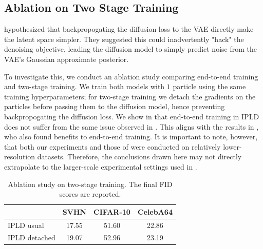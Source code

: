 \subsection{Ablation on Two Stage Training}
\label{app:2stage_ablate}
\citet{leng2025repaeunlockingvaeendtoend} hypothesized that backpropogating the diffusion loss to the \gls*{VAE} directly make the latent space simpler. They suggested this could inadvertently "hack" the denoising objective, leading the diffusion model to simply predict noise from the \gls*{VAE}'s Gaussian approximate posterior.

To investigate this, we conduct an ablation study comparing end-to-end training and two-stage training. We train both models with $1$ particle using the same training hyperparameters; for two-stage training we detach the gradients on the particles before passing them to the diffusion model, hence preventing backpropogating the diffusion loss. We show in  that end-to-end training in \gls*{IPLD} does not suffer from the same issue observed in \citet{leng2025repaeunlockingvaeendtoend}. This aligns with the results in \citet{vahdatscorebasedgenerativemodeling2021}, who also found benefits to end-to-end training. It is important to note, however, that both our experiments and those of \citet{vahdatscorebasedgenerativemodeling2021} were conducted on relatively lower-resolution datasets. Therefore, the conclusions drawn here may not directly extrapolate to the larger-scale experimental settings used in \citet{leng2025repaeunlockingvaeendtoend}.
\begin{table}[htp]
    \centering
    \begin{tabular}{lccc}
\hline
& SVHN           & CIFAR-10      & CelebA64    \\ \hline
\gls*{IPLD} usual & 17.55     &  51.60    & 22.86   \\
\gls*{IPLD} detached & 19.07 & 52.96 &  23.19 \\
\hline
\end{tabular}
    \vspace{0.2cm}
    \caption{Ablation study on two-stage training.  The final \gls*{FID} scores are reported.}
    \label{tab:app_ablate_2stage}
\end{table}

